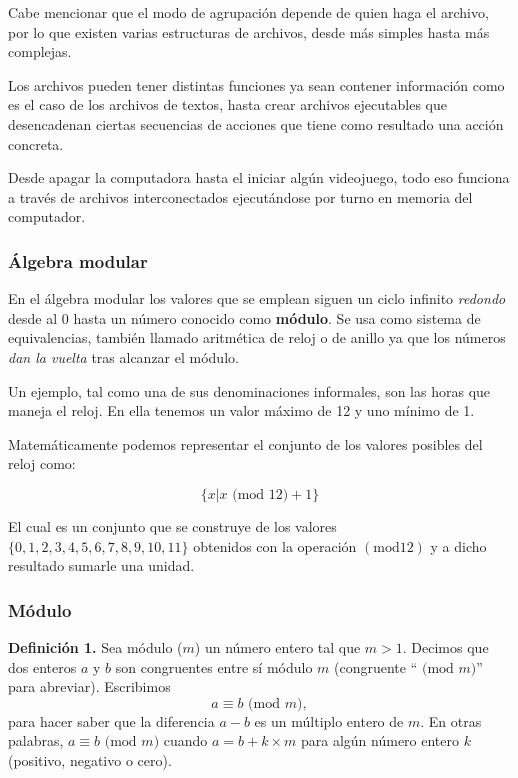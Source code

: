 \documentclass[a4paper]{article}
\begin{document}
Cabe mencionar que el modo de agrupación depende de quien haga el archivo, por
lo que existen varias estructuras de archivos, desde más simples hasta más
complejas.

Los archivos pueden tener distintas funciones ya sean contener información como
es el caso de los archivos de textos, hasta crear archivos ejecutables que
desencadenan ciertas secuencias de acciones que tiene como resultado una acción
concreta.

Desde apagar la computadora hasta el iniciar algún videojuego, todo eso
funciona a través de archivos interconectados ejecutándose por turno en memoria
del computador.

\autocite{ARCHIVO}

\subsubsection{Álgebra modular}

En el álgebra modular los valores que se emplean siguen un ciclo infinito
\textit{redondo} desde al 0 hasta un número conocido como \textbf{módulo}. Se
usa como sistema de equivalencias, también llamado aritmética de reloj o de
anillo ya que los números \textit{dan la vuelta} tras alcanzar el módulo.

\autocite{wikimod}

Un ejemplo, tal como una de sus denominaciones informales, son las horas que
maneja el reloj. En ella tenemos un valor máximo de 12 y uno mínimo de 1.

Matemáticamente podemos representar el conjunto de los valores posibles del
reloj como:

\[
\{x | x \text{ (mod }12\text{)} + 1\}
\]

El cual es un conjunto que se construye de los valores
$\{0,1,2,3,4,5,6,7,8,9,10,11\}$ obtenidos con la operación $(\text{mod} 12)$ y
a dicho resultado sumarle una unidad.

\subsubsection{Módulo}

\textbf{Definición 1.} Sea módulo ($m$) un número entero tal que $m > 1$.
Decimos que dos enteros $a$ y $b$ son congruentes entre sí módulo $m$
(congruente “$\text{ (mod }m\text{)}$” para abreviar). Escribimos
\[a \equiv b \text{ (mod }m\text{)},\]
para hacer saber que la diferencia $a - b$ es un múltiplo entero de $m$. En
otras palabras, $a \equiv b \text{ (mod }m\text{)}$ cuando $a = b + k \times m$
para algún número entero $k$ (positivo, negativo o cero).
\end{document}
